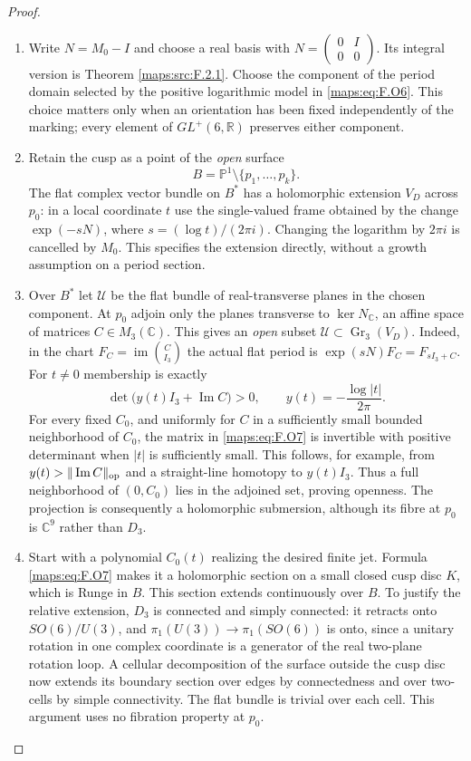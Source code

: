 \documentclass[11pt,a4paper]{article}
\theoremstyle{definition}
\begin{document}
\begin{proof}
\begin{enumerate}[label=\arabic*.]
\item Write $N=M_0-I$ and choose a real basis with
$N=\left(\begin{smallmatrix}0&I\\0&0\end{smallmatrix}\right)$.
Its integral version is Theorem \ref{maps:src:F.2.1}.  Choose the component
of the period domain selected by the positive logarithmic
model in \eqref{maps:eq:F.O6}.  This choice matters only when an orientation
has been fixed independently of the marking; every element
of $GL^+(6,\mathbb R)$ preserves either component.

\item Retain the cusp as a point of the \emph{open} surface
\[
 B=\mathbb P^1\setminus\{p_1,\ldots,p_k\}.
\]
The flat complex vector bundle on $B^*$ has a holomorphic
extension $V_D$ across $p_0$: in a local coordinate $t$ use
the single-valued frame obtained by the change
$\exp(-sN)$, where $s=(\log t)/(2\pi i)$.
Changing the logarithm by $2\pi i$ is cancelled by $M_0$.
This specifies the extension directly, without a growth
assumption on a period section.

\item Over $B^*$ let $\mathscr U$ be the flat bundle of real-transverse
planes in the chosen component.  At $p_0$ adjoin only the
planes transverse to $\ker N_\mathbb C$, an affine space of
matrices $C\in M_3(\mathbb C)$.  This gives an \emph{open}
subset $\mathscr U\subset\operatorname{Gr}_3(V_D)$.
Indeed, in the chart $F_C=\operatorname{im}\binom C{I_3}$
the actual flat period is
$\exp(sN)F_C=F_{sI_3+C}$.  For $t\ne0$ membership is exactly
\[
 \det\bigl(y(t)I_3+\operatorname{Im}C\bigr)>0,
 \qquad y(t)=-\frac{\log|t|}{2\pi}.
 \tag{F.O7}\label{maps:eq:F.O7}
\]
For every fixed $C_0$, and uniformly for $C$ in a sufficiently
small bounded neighborhood of $C_0$, the matrix in \eqref{maps:eq:F.O7} is
invertible with positive determinant when $|t|$ is sufficiently
small.  This follows, for example, from
$y(t)>\|\operatorname{Im}C\|_{\rm op}$ and a straight-line
homotopy to $y(t)I_3$.  Thus a full neighborhood of
$(0,C_0)$ lies in the adjoined set, proving openness.
The projection is consequently a holomorphic submersion,
although its fibre at $p_0$ is $\mathbb C^9$ rather than $D_3$.

\item Start with a polynomial $C_0(t)$ realizing the desired finite
jet.  Formula \eqref{maps:eq:F.O7} makes it a holomorphic section on a small
closed cusp disc $K$, which is Runge in $B$.
This section extends continuously over $B$.  To justify the
relative extension, $D_3$ is connected and simply connected:
it retracts onto $SO(6)/U(3)$, and
$\pi_1(U(3))\to\pi_1(SO(6))$ is onto, since a unitary rotation
in one complex coordinate is a generator of the real
two-plane rotation loop.  A cellular decomposition of the
surface outside the cusp disc now extends its boundary
section over edges by connectedness and over two-cells by
simple connectivity.  The flat bundle is trivial over each
cell.  This argument uses no fibration property at $p_0$.


\end{enumerate}
\end{proof}
\end{document}
